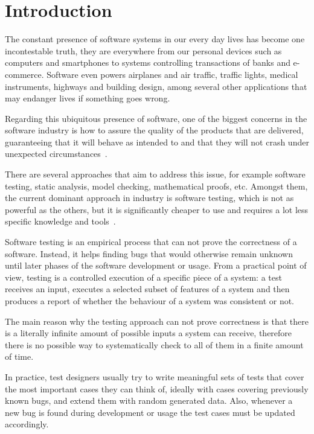 \chapter{Introduction}

The constant presence of software systems in our every day lives has become one incontestable truth, they are everywhere from our personal devices such as computers and smartphones to systems controlling transactions of banks and e-commerce. Software even powers airplanes and air traffic, traffic lights, medical instruments, highways and building design, among several other applications that may endanger lives if something goes wrong.

Regarding this ubiquitous presence of software, one of the biggest concerns in the software industry is how to assure the quality of the products that are delivered, guaranteeing that it will behave as intended to and that they will not crash under unexpected circumstances~\cite{Ammann2008}.

There are several approaches that aim to address this issue, for example software testing, static analysis, model checking, mathematical proofs, etc. Amongst them, the current dominant approach in industry is software testing, which is not as powerful as the others, but it is significantly cheaper to use and requires a lot less specific knowledge and tools~\cite{Meyer2008, Utting2006}.

Software testing is an empirical process that can not prove the correctness of a software. Instead, it helps finding bugs that would otherwise remain unknown until later phases of the software development or usage. From a practical point of view, testing is a controlled execution of a specific piece of a system: a test receives an input, executes a selected subset of features of a system and then produces a report of whether the behaviour of a system was consistent or not. 

The main reason why the testing approach can not prove correctness is that there is a literally infinite amount of possible inputs a system can receive, therefore there is no possible way to systematically check to all of them in a finite amount of time.

In practice, test designers usually try to write meaningful sets of tests that cover the most important cases they can think of, ideally with cases covering previously known bugs, and extend them with random generated data. Also, whenever a new bug is found during development or usage the test cases must be updated accordingly.

